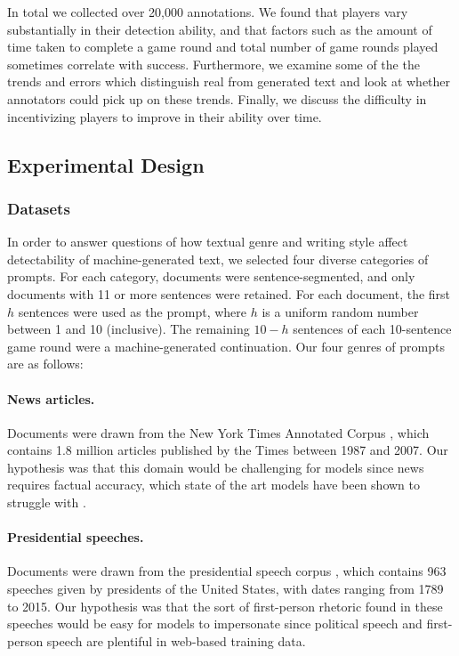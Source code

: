 In total we collected over 20,000 annotations.
We found that players vary substantially in their detection ability, and that factors such as the amount of time taken to complete a game round and total number of game rounds played sometimes correlate with success.
Furthermore, we examine some of the the trends and errors which distinguish real from generated text and look at whether annotators could pick up on these trends.
Finally, we discuss the difficulty in incentivizing players to improve in their ability over time.

\subsection{Experimental Design}

\subsubsection{Datasets}
In order to answer questions of how textual genre and writing style affect detectability of machine-generated text, we selected four diverse categories of prompts. 
For each category, documents were sentence-segmented, and only documents with 11 or more sentences were retained.
For each document, the first $h$ sentences were used as the prompt, where $h$ is a uniform random number between 1 and 10 (inclusive). The remaining $10-h$ sentences of each 10-sentence game round were a machine-generated continuation. Our four genres of prompts are as follows:

\paragraph{News articles.}
Documents were drawn from the New York Times Annotated Corpus \citep{sandhaus2008new}, which contains 1.8 million articles published by the Times between 1987 and 2007.
Our hypothesis was that this domain would be challenging for models since news requires factual accuracy, which state of the art models have been shown to struggle with \cite{nakano2021webgpt, lin2021truthfulqa}. 

\paragraph{Presidential speeches.}
Documents were drawn from the presidential speech corpus \citep{brown2016cops}, which contains 963 speeches given by presidents of the United States, with dates ranging from 1789 to 2015.
Our hypothesis was that the sort of first-person rhetoric found in these speeches would be easy for models to impersonate since political speech and first-person speech are plentiful in web-based training data.

